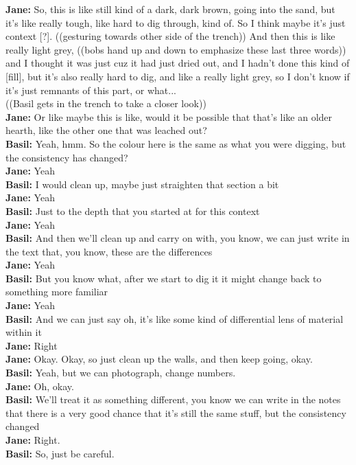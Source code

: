 \documentclass[
]{article}
\begin{document}
\textbf{Jane:} So, this is like still kind of a dark, dark brown, going
into the sand, but it's like really tough, like hard to dig through,
kind of. So I think maybe it's just context {[}?{]}. ((gesturing towards
other side of the trench)) And then this is like really light grey,
((bobs hand up and down to emphasize these last three words)) and I
thought it was just cuz it had just dried out, and I hadn't done this
kind of {[}fill{]}, but it's also really hard to dig, and like a really
light grey, so I don't know if it's just remnants of this part, or
what...\\
((Basil gets in the trench to take a closer look))\\
\textbf{Jane:} Or like maybe this is like, would it be possible that
that's like an older hearth, like the other one that was leached out?\\
\textbf{Basil:} Yeah, hmm. So the colour here is the same as what you
were digging, but the consistency has changed?\\
\textbf{Jane:} Yeah\\
\textbf{Basil:} I would clean up, maybe just straighten that section a
bit\\
\textbf{Jane:} Yeah\\
\textbf{Basil:} Just to the depth that you started at for this context\\
\textbf{Jane:} Yeah\\
\textbf{Basil:} And then we'll clean up and carry on with, you know, we
can just write in the text that, you know, these are the differences\\
\textbf{Jane:} Yeah\\
\textbf{Basil:} But you know what, after we start to dig it it might
change back to something more familiar\\
\textbf{Jane:} Yeah\\
\textbf{Basil:} And we can just say oh, it's like some kind of
differential lens of material within it\\
\textbf{Jane:} Right\\
\textbf{Jane:} Okay. Okay, so just clean up the walls, and then keep
going, okay.\\
\textbf{Basil:} Yeah, but we can photograph, change numbers.\\
\textbf{Jane:} Oh, okay.\\
\textbf{Basil:} We'll treat it as something different, you know we can
write in the notes that there is a very good chance that it's still the
same stuff, but the consistency changed\\
\textbf{Jane:} Right.\\
\textbf{Basil:} So, just be careful.
\end{document}
